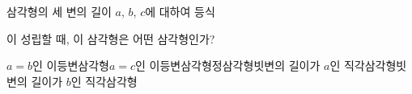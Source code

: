 삼각형의 세 변의 길이 $a$, $b$, $c$에 대하여 등식 \par\smallskip{}\par\smallskip\noindent 이 성립할 때, 이 삼각형은 어떤 삼각형인가?
\begin{choicesv}{$a=b$인 이등변삼각형}{$a=c$인 이등변삼각형}{정삼각형}{빗변의 길이가 $a$인 직각삼각형}{빗변의 길이가 $b$인 직각삼각형}\end{choicesv}
